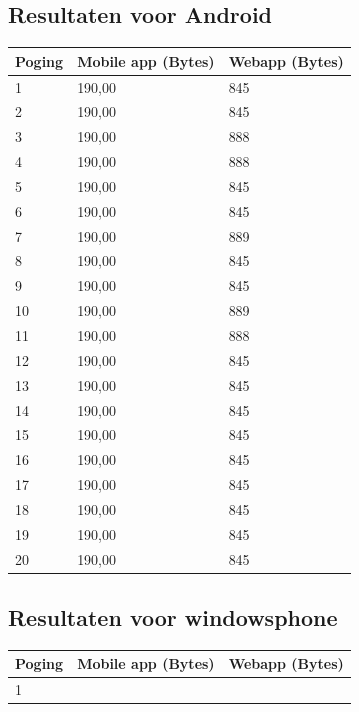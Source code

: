 \documentclass[pdftex,a4paper,12pt,twoside]{report}
\begin{document}
\subsection{Resultaten voor Android}
\begin{center}
  \begin{tabular}{ | l | l | l |}
      \hline
      Poging & Mobile app (Bytes) & Webapp (Bytes)
      \\ \hline
      1 & 190,00 & 845
      \\ \hline
      2 & 190,00 & 845
      \\ \hline
      3 & 190,00 & 888
      \\ \hline
      4 & 190,00 & 888
      \\ \hline
      5 & 190,00 & 845
      \\ \hline
      6 & 190,00 & 845
      \\ \hline
      7 & 190,00 & 889
      \\ \hline
      8 & 190,00 & 845
      \\ \hline
      9 & 190,00 & 845
      \\ \hline
      10 & 190,00 & 889
      \\ \hline
      11 & 190,00 & 888
      \\ \hline
      12 & 190,00 & 845
      \\ \hline
      13 & 190,00 & 845
      \\ \hline
      14 & 190,00 & 845
      \\ \hline
      15 & 190,00 & 845
      \\ \hline
      16 & 190,00 & 845
      \\ \hline
      17 & 190,00 & 845
      \\ \hline
      18 & 190,00 & 845
      \\ \hline
      19 & 190,00 & 845
      \\ \hline
      20 & 190,00 & 845
      \\ \hline
  \end{tabular}
\end{center}
\newpage
\subsection{Resultaten voor windowsphone}
\begin{center}
  \begin{tabular}{ | l | l | l |}
      \hline
      Poging & Mobile app (Bytes) & Webapp (Bytes)
      \\ \hline
      1 &
      \\ \hline
  \end{tabular}
\end{center}
\newpage
\end{document}
